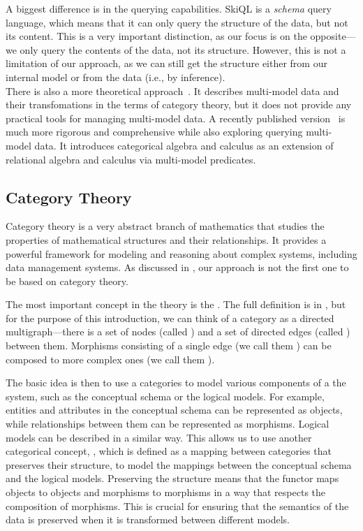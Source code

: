 A biggest difference is in the querying capabilities. SkiQL is a \emph{schema} query language, which means that it can only query the structure of the data, but not its content. This is a very important distinction, as our focus is on the opposite---we only query the contents of the data, not its structure. However, this is not a limitation of our approach, as we can still get the structure either from our internal model or from the data (i.e., by inference).\\

There is also a more theoretical approach~\citep{DBLP:journals/corr/abs-2201-04905}. It describes multi-model data and their transfomations in the terms of category theory, but it does not provide any practical tools for managing multi-model data. A recently published version~\citep{lu2025part1, lu2025part2} is much more rigorous and comprehensive while also exploring querying multi-model data. It introduces categorical algebra and calculus as an extension of relational algebra and calculus via multi-model predicates.

\subsection{Category Theory}

Category theory is a very abstract branch of mathematics that studies the properties of mathematical structures and their relationships. It provides a powerful framework for modeling and reasoning about complex systems, including data management systems. As discussed in , our approach is not the first one to be based on category theory.

The most important concept in the theory is the . The full definition is in , but for the purpose of this introduction, we can think of a category as a directed multigraph---there is a set of nodes (called ) and a set of directed edges (called ) between them. Morphisms consisting of a single edge (we call them ) can be composed to more complex ones (we call them ).


The basic idea is then to use a categories to model various components of a the system, such as the conceptual schema or the logical models. For example, entities and attributes in the conceptual schema can be represented as objects, while relationships between them can be represented as morphisms. Logical models can be described in a similar way. This allows us to use another categorical concept, , which is defined as a mapping between categories that preserves their structure, to model the mappings between the conceptual schema and the logical models. Preserving the structure means that the functor maps objects to objects and morphisms to morphisms in a way that respects the composition of morphisms. This is crucial for ensuring that the semantics of the data is preserved when it is transformed between different models.

